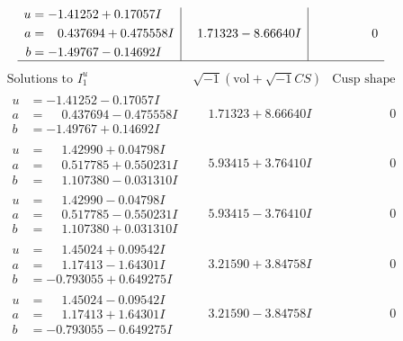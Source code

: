 \documentclass[1p]{elsarticle_modified}
\theoremstyle{definition}
\newcommand{\I}{\sqrt{-1}}
\begin{document}
$$\begin{array}{c|c|c}
\begin{aligned}
u &= -1.41252 + 0.17057 I \\
a &= \phantom{-}0.437694 + 0.475558 I \\
b &= -1.49767 - 0.14692 I\end{aligned}
 & \phantom{-}1.71323 - 8.66640 I & \phantom{-0.000000 } 0\\
 \hline 
 \end{array}$$\newpage$$\begin{array}{c|c|c}  
\text{Solutions to }I^u_{1}& \I (\text{vol} + \sqrt{-1}CS) & \text{Cusp shape}\\
 \hline 
\begin{aligned}
u &= -1.41252 - 0.17057 I \\
a &= \phantom{-}0.437694 - 0.475558 I \\
b &= -1.49767 + 0.14692 I\end{aligned}
 & \phantom{-}1.71323 + 8.66640 I & \phantom{-0.000000 } 0 \\ \hline\begin{aligned}
u &= \phantom{-}1.42990 + 0.04798 I \\
a &= \phantom{-}0.517785 + 0.550231 I \\
b &= \phantom{-}1.107380 - 0.031310 I\end{aligned}
 & \phantom{-}5.93415 + 3.76410 I & \phantom{-0.000000 } 0 \\ \hline\begin{aligned}
u &= \phantom{-}1.42990 - 0.04798 I \\
a &= \phantom{-}0.517785 - 0.550231 I \\
b &= \phantom{-}1.107380 + 0.031310 I\end{aligned}
 & \phantom{-}5.93415 - 3.76410 I & \phantom{-0.000000 } 0 \\ \hline\begin{aligned}
u &= \phantom{-}1.45024 + 0.09542 I \\
a &= \phantom{-}1.17413 - 1.64301 I \\
b &= -0.793055 + 0.649275 I\end{aligned}
 & \phantom{-}3.21590 + 3.84758 I & \phantom{-0.000000 } 0 \\ \hline\begin{aligned}
u &= \phantom{-}1.45024 - 0.09542 I \\
a &= \phantom{-}1.17413 + 1.64301 I \\
b &= -0.793055 - 0.649275 I\end{aligned}
 & \phantom{-}3.21590 - 3.84758 I & \phantom{-0.000000 } 0 \\ \hline\begin{aligned}

\end{aligned}
\end{array}$$
\end{document}
